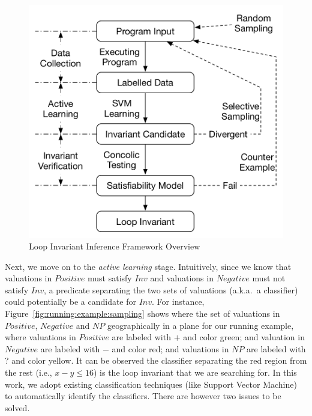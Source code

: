 \begin{figure}[t]
    \centering
    \includegraphics[scale=0.45]{figures/overview.pdf}
    \caption{Loop Invariant Inference Framework Overview}
    \label{fig:overview}
\end{figure}

Next, we move on to the \emph{active learning} stage. Intuitively, since we know that valuations in $Positive$ must satisfy $Inv$ and valuations in $Negative$ must not satisfy $Inv$, a predicate separating the two sets of valuations (a.k.a.~a classifier) could potentially be a candidate for $Inv$. 
For instance, Figure~\ref{fig:running:example:sampling} shows where the set of valuations in $Positive$, $Negative$ and $NP$ geographically in a plane for our running example, where valuations in $Positive$ are labeled with $+$ and color green; and valuation in $Negative$ are labeled with $-$ and color red; and valuations in $NP$ are labeled with ? and color yellow. It can be observed the classifier separating the red region from the rest (i.e., $x - y \leq 16$) is the loop invariant that we are searching for. In this work, we adopt existing classification techniques (like Support Vector Machine) to automatically identify the classifiers. There are however two issues to be solved. 

